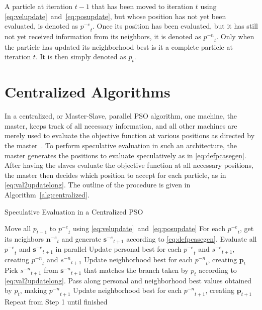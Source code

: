 \documentclass[ms,electronic,twosidetoc,letterpaper,chaptercenter,parttop,equalmargins]{byumsphd}
\newcommand{\alg}[1]{Algorithm~\ref{alg:#1}}
\providecommand{\noeval}[1]{\ensuremath{#1^{-e}}}
\providecommand{\nonbest}[1]{\ensuremath{#1^{-n}}}
\providecommand{\p}{\ensuremath{p}}
\providecommand{\pset}{\ensuremath{\mathbf{p}}}
\providecommand{\s}{\ensuremath{s}}
\providecommand{\sset}{\ensuremath{\mathbf{s}}}
\providecommand{\nset}{\ensuremath{\mathbf{n}}}
\begin{document}
A particle at iteration $t-1$ that has been moved to iteration $t$ using
\eqref{eq:velupdate}~and~\eqref{eq:posupdate}, but whose position has
not yet been evaluated, is denoted as $\noeval{\p}_t$.  Once its position has
been evaluated, but it has still not yet received information from its
neighbors, it is denoted as $\nonbest{\p}_t$.  Only when the particle has
updated its neighborhood best is it a complete particle at iteration $t$.  It
is then simply denoted as $\p_t$.

\section{Centralized Algorithms}

In a centralized, or Master-Slave, parallel PSO algorithm, one machine, the
master, keeps track of all necessary information, and all other machines are
merely used to evaluate the objective function at various positions as directed
by the master~\citep{belal-2004-parallel-models-for-pso}.  To perform
speculative evaluation in such an architecture, the master generates the
positions to evaluate speculatively as in \eqref{eq:defpcasegen}.  After having
the slaves evaluate the objective function at all necessary positions, the
master then decides which position to accept for each particle, as in
\eqref{eq:val2updatelong}.  The outline of the procedure is given in
\alg{centralized}.

\begin{algorithm}
  \caption{Speculative Evaluation in a Centralized PSO}
  \label{alg:centralized}
  \begin{algorithmic}[1]
	\STATE Move all $\p_{t-1}$ to $\noeval{\p}_t$ using
	  \eqref{eq:velupdate}~and~\eqref{eq:posupdate}
	\STATE For each $\noeval{\p}_t$, get its neighbors $\noeval{\nset}_t$ and
	  generate $\noeval{\sset}_{t+1}$ according to
	  \eqref{eq:defpcasegen}.
	\STATE Evaluate all $\noeval{\p}_t$ and $\noeval{\sset}_{t+1}$ in parallel
	\STATE Update personal best for each $\noeval{\p}_t$ and
	  $\noeval{\s}_{t+1}$, creating $\nonbest{\p}_t$ and $\nonbest{\s}_{t+1}$
	\STATE Update neighborhood best for each $\nonbest{\p}_t$, creating
	  $\pset_t$
	\FORALL{$\p_t$}
	\STATE Pick $\nonbest{\s}_{t+1}$ from $\nonbest{\sset}_{t+1}$ that matches
	  the branch taken by $\p_t$ according to
	  \eqref{eq:val2updatelong}.
	\STATE Pass along personal and neighborhood best values obtained by $\p_t$,
	  making $\nonbest{\p}_{t+1}$
	\ENDFOR
	\STATE Update neighborhood best for each $\nonbest{\p}_{t+1}$, creating
	  $\pset_{t+1}$
	\STATE Repeat from Step 1 until finished
  \end{algorithmic}
\end{algorithm}
\end{document}
